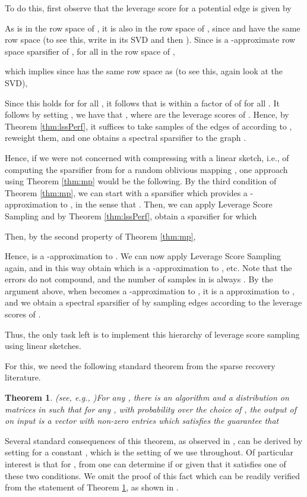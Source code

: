 \documentclass[11pt]{article}
\newtheorem{theorem}{Theorem}
\begin{document}
To do this, first observe that the leverage score for a potential edge  is given by

As  is in the row space of , it is also in the row space of ,
since  and  have the same row space (to see this, write 
in its SVD and then ). Since  is a 
-approximate row space sparsifier of , for all  in the row space of , 

which implies since  has the same row space as  (to see this, again look at the SVD), 

Since this holds for  for all , it follows that  is within a factor
of  of  for all . It follows 
by setting , we have that , where 
are the leverage scores of . Hence, by Theorem \ref{thm:lssPerf}, 
it suffices to take  samples of the edges of  according to , reweight them,
and one obtains a spectral sparsifier to the graph . 

Hence, if we were not concerned with compressing  with a linear sketch, i.e., 
of computing the sparsifier  from  for a random oblivious
mapping , one approach using
Theorem \ref{thm:mp} would be the following. By the third condition of Theorem \ref{thm:mp}, 
we can start with a sparsifier  which provides a -approximation to , 
in the sense that . Then, we can apply Leverage Score Sampling
and by Theorem \ref{thm:lssPerf}, obtain a sparsifier  for which 

Then, by the second property of Theorem \ref{thm:mp}, 

Hence,  is a -approximation to . We can now apply Leverage Score Sampling
again, and in this way obtain  which is a -approximation to , etc. Note that
the errors do not compound, and the number of samples in  is always . By
the argument above, when  becomes a -approximation to , it is a 
approximation to , and we obtain a spectral sparsifier of  by sampling  edges
according to the leverage scores of . 

Thus, the only task left is to implement this hierarchy of leverage score sampling using linear sketches. 

For this, we need the following standard theorem from the sparse recovery literature. 
\begin{theorem}(see, e.g., \cite{ccf04,GLPS})\label{thm:hh}
For any , there is an algorithm  and a 
distribution on matrices  in 
such that for any , with probability  over the choice of , the output of
 on input  is a vector  with  non-zero entries which satisfies the 
guarantee that 

\end{theorem}
Several standard consequences of this theorem, as observed in \cite{KLMMS14}, 
can be derived by setting  for a constant , which is the setting of 
we use throughout.  
Of particular interest is that for , from  one can determine
if  or  given that it satisfies one of 
these two conditions. We omit the proof of this fact which can be readily verified from the statement
of Theorem \ref{thm:hh}, as shown in \cite{KLMMS14}. 
\end{document}

